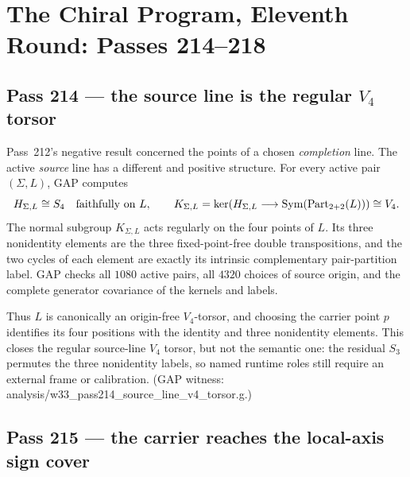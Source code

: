 \documentclass[12pt,a4paper]{article}
\def\texttt#1{#1}%
\theoremstyle{definition}
\begin{document}
\section{The Chiral Program, Eleventh Round: Passes 214--218}
\label{sec:chiral-program-eleven}

\subsection{Pass 214 --- the source line is the regular $V_4$ torsor}
\label{ssec:pass214}

Pass~212's negative result concerned the points of a chosen \emph{completion}
line.  The active \emph{source} line has a different and positive structure.
For every active pair $(\Sigma,L)$, GAP computes
\[
 H_{\Sigma,L}\cong S_4
 \quad\hbox{faithfully on }L,
 \qquad
 K_{\Sigma,L}=\ker\!\left(
 H_{\Sigma,L}\longrightarrow
 \operatorname{Sym}(\operatorname{Part}_{2+2}(L))
 \right)\cong V_4.
\]
The normal subgroup $K_{\Sigma,L}$ acts regularly on the four points of
$L$.  Its three nonidentity elements are the three fixed-point-free double
transpositions, and the two cycles of each element are exactly its intrinsic
complementary pair-partition label.  GAP checks all $1080$ active pairs, all
$4320$ choices of source origin, and the complete generator covariance of
the kernels and labels.

Thus $L$ is canonically an origin-free $V_4$-torsor, and choosing the carrier
point $p$ identifies its four positions with the identity and three
nonidentity elements.  This closes the regular source-line $V_4$ torsor, but not
the semantic one: the residual $S_3$ permutes the three nonidentity labels,
so named runtime roles still require an external frame or calibration.
(GAP witness:
\texttt{analysis/w33\_pass214\_source\_line\_v4\_torsor.g}.)

\subsection{Pass 215 --- the carrier reaches the local-axis sign cover}
\label{ssec:pass215}
\end{document}
